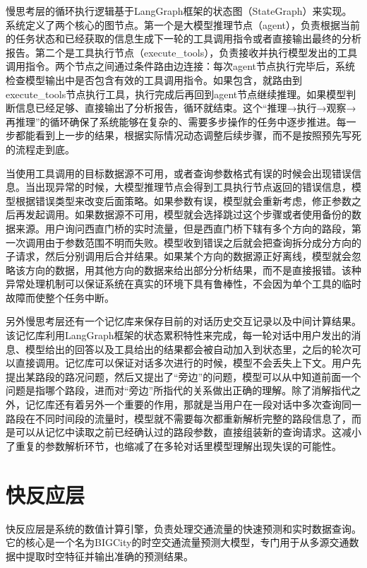 慢思考层的循环执行逻辑基于LangGraph框架的状态图（StateGraph）来实现。系统定义了两个核心的图节点。第一个是大模型推理节点（agent），负责根据当前的任务状态和已经获取的信息生成下一轮的工具调用指令或者直接输出最终的分析报告。第二个是工具执行节点（execute\_tools），负责接收并执行模型发出的工具调用指令。两个节点之间通过条件路由边连接：每次agent节点执行完毕后，系统检查模型输出中是否包含有效的工具调用指令。如果包含，就路由到execute\_tools节点执行工具，执行完成后再回到agent节点继续推理。如果模型判断信息已经足够、直接输出了分析报告，循环就结束。这个“推理→执行→观察→再推理”的循环确保了系统能够在复杂的、需要多步操作的任务中逐步推进。每一步都能看到上一步的结果，根据实际情况动态调整后续步骤，而不是按照预先写死的流程走到底。

当使用工具调用的目标数据源不可用，或者查询参数格式有误的时候会出现错误信息。当出现异常的时候，大模型推理节点会得到工具执行节点返回的错误信息，模型根据错误类型来改变后面策略。如果参数有误，模型就会重新考虑，修正参数之后再发起调用。如果数据源不可用，模型就会选择跳过这个步骤或者使用备份的数据来源。用户询问西直门桥的实时流量，但是西直门桥下辖有多个方向的路段，第一次调用由于参数范围不明而失败。模型收到错误之后就会把查询拆分成分方向的子请求，然后分别调用后合并结果。如果某个方向的数据源正好离线，模型就会忽略该方向的数据，用其他方向的数据来给出部分分析结果，而不是直接报错。该种异常处理机制可以保证系统在真实的环境下具有鲁棒性，不会因为单个工具的临时故障而使整个任务中断。

另外慢思考层还有一个记忆库来保存目前的对话历史交互记录以及中间计算结果。该记忆库利用LangGraph框架的状态累积特性来完成，每一轮对话中用户发出的消息、模型给出的回答以及工具给出的结果都会被自动加入到状态里，之后的轮次可以直接调用。记忆库可以保证对话多次进行的时候，模型不会丢失上下文。用户先提出某路段的路况问题，然后又提出了“旁边”的问题，模型可以从中知道前面一个问题是指哪个路段，进而对“旁边”所指代的关系做出正确的理解。除了消解指代之外，记忆库还有着另外一个重要的作用，那就是当用户在一段对话中多次查询同一路段在不同时间段的流量时，模型就不需要每次都重新解析完整的路段信息了，而是可以从记忆中读取之前已经确认过的路段参数，直接组装新的查询请求。这减小了重复的参数解析环节，也缩减了在多轮对话里模型理解出现失误的可能性。

\section{快反应层}

快反应层是系统的数值计算引擎，负责处理交通流量的快速预测和实时数据查询。它的核心是一个名为BIGCity的时空交通流量预测大模型，专门用于从多源交通数据中提取时空特征并输出准确的预测结果。

